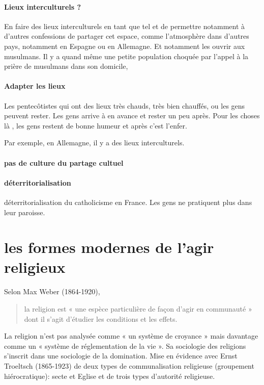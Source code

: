 \paragraph{Lieux interculturels ? }
En faire des lieux interculturels en tant que tel et de permettre notamment à  d'autres confessions de partager cet espace, comme l'atmosphère dans d'autres pays, notamment en Espagne ou en Allemagne.
Et notamment les ouvrir aux musulmans. Il y a quand même une petite population choquée par l'appel à la prière de musulmans dans son domicile,  

\paragraph{Adapter les lieux}
Les pentecôtistes qui ont des lieux très chauds, très bien chauffés, ou les gens peuvent rester.
Les gens arrive à en avance et rester un peu après. Pour les choses là , les gens restent de bonne humeur et après c'est l'enfer.

Par exemple, en Allemagne, il y a des lieux interculturels. 


\paragraph{pas de culture du partage cultuel}

\paragraph{déterritorialisation}

  déterritorialisation du catholicisme en France. Les gens ne pratiquent plus dans leur paroisse.
  
\section{les formes modernes de l'agir religieux}


Selon Max Weber (1864-1920), 

\begin{quote}
    la religion est « une espèce particulière de façon d’agir en
communauté » dont il s’agit d’étudier les conditions et les effets.
\end{quote}
 La religion n’est pas analysée comme
« un système de croyance » mais davantage comme un « système de réglementation de la vie ». Sa
sociologie des religions s’inscrit dans une sociologie de la domination. Mise en évidence avec Ernst
Troeltsch (1865-1923) de deux types de communalisation religieuse (groupement hiérocratique): secte
et Eglise et de trois types d’autorité religieuse.




